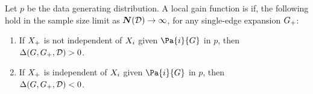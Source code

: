 \documentclass[letterpaper]{article}
\begin{document}
\begin{definition}
 Let $p$ be the data generating distribution. A local gain function is  if, the following hold in the sample size limit as $\boldsymbol{N}(\mathcal{D}) \rightarrow \infty$, for any single-edge expansion $G_{+}$:



\begin{enumerate}
\item If $X_{+}$ is not independent of $X_{i}$ given  $\Pa{i}{\graph}$ in $p$, then \\$\Delta(G,G_{+},\mathcal{D}) > 0$.
\item If $X_{+}$ is independent of $X_{i}$ given  $\Pa{i}{\graph}$ in $p$, then \\$\Delta(G,G_{+},\mathcal{D}) < 0$.
\end{enumerate}

\end{definition}
%
%
%
\end{document}
